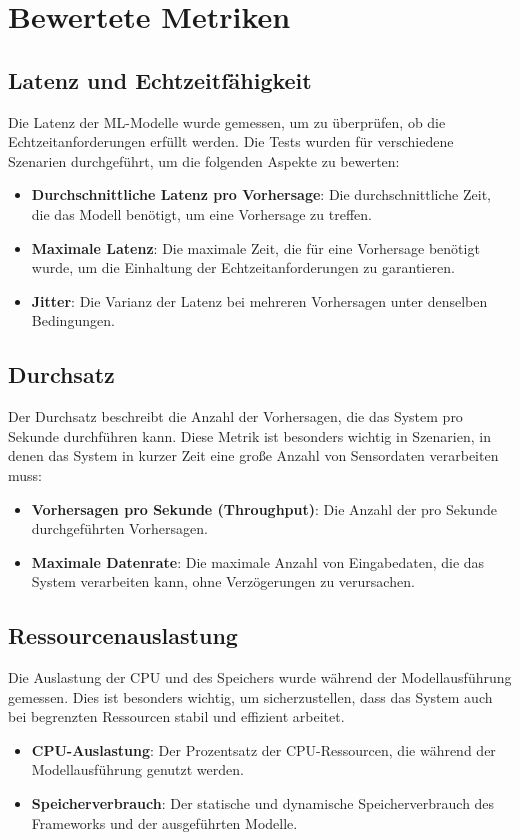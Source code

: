 \section{Bewertete Metriken}

\subsection{Latenz und Echtzeitfähigkeit}
Die Latenz der ML-Modelle wurde gemessen, um zu überprüfen, ob die Echtzeitanforderungen erfüllt werden. Die Tests wurden für verschiedene 
Szenarien durchgeführt, um die folgenden Aspekte zu bewerten:
\begin{itemize}
    \item \textbf{Durchschnittliche Latenz pro Vorhersage}: Die durchschnittliche Zeit, die das Modell benötigt, um eine Vorhersage zu treffen.
    \item \textbf{Maximale Latenz}: Die maximale Zeit, die für eine Vorhersage benötigt wurde, um die Einhaltung der Echtzeitanforderungen zu 
    garantieren.
    \item \textbf{Jitter}: Die Varianz der Latenz bei mehreren Vorhersagen unter denselben Bedingungen.
\end{itemize}

\subsection{Durchsatz}
Der Durchsatz beschreibt die Anzahl der Vorhersagen, die das System pro Sekunde durchführen kann. Diese Metrik ist besonders wichtig in Szenarien, 
in denen das System in kurzer Zeit eine große Anzahl von Sensordaten verarbeiten muss:
\begin{itemize}
    \item \textbf{Vorhersagen pro Sekunde (Throughput)}: Die Anzahl der pro Sekunde durchgeführten Vorhersagen.
    \item \textbf{Maximale Datenrate}: Die maximale Anzahl von Eingabedaten, die das System verarbeiten kann, ohne Verzögerungen zu verursachen.
\end{itemize}

\subsection{Ressourcenauslastung}
Die Auslastung der CPU und des Speichers wurde während der Modellausführung gemessen. Dies ist besonders wichtig, um sicherzustellen, 
dass das System auch bei begrenzten Ressourcen stabil und effizient arbeitet.
\begin{itemize}
    \item \textbf{CPU-Auslastung}: Der Prozentsatz der CPU-Ressourcen, die während der Modellausführung genutzt werden.
    \item \textbf{Speicherverbrauch}: Der statische und dynamische Speicherverbrauch des Frameworks und der ausgeführten Modelle.
\end{itemize}

